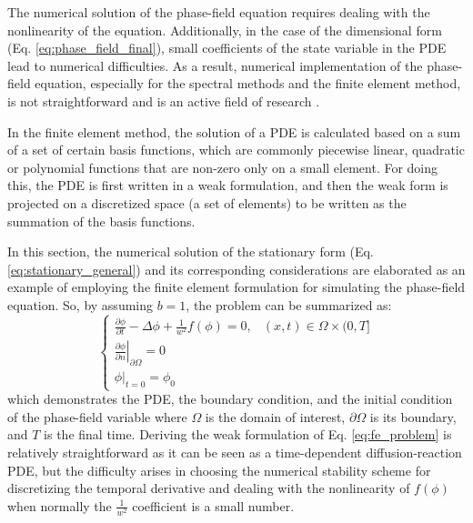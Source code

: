 The numerical solution of the phase-field equation requires dealing with the nonlinearity of the equation. Additionally, in the case of the dimensional form (Eq. \ref{eq:phase_field_final}), small coefficients of the state variable in the \gls{PDE} lead to numerical difficulties. As a result, numerical implementation of the phase-field equation, especially for the spectral methods and the finite element method, is not straightforward and is an active field of research \cite{Shen2010,Abboud2019}.

In the finite element method, the solution of a \gls{PDE} is calculated based on a sum of a set of certain basis functions, which are commonly piecewise linear, quadratic or polynomial functions that are non-zero only on a small element. For doing this, the \gls{PDE} is first written in a weak formulation, and then the weak form is projected on a discretized space (a set of elements) to be written as the summation of the basis functions.

In this section, the numerical solution of the stationary form (Eq. \ref{eq:stationary_general}) and its corresponding considerations are elaborated as an example of employing the finite element formulation for simulating the phase-field equation. So, by assuming $b=1$, the problem can be summarized as:
\begin{equation} \label{eq:fe_problem}
\left\{\begin{array}{ll}
\frac{\partial \phi}{\partial t}-\Delta \phi+\frac{1}{w^{2}} f(\phi)=0, & (x, t) \in \Omega \times(0, T] \\
\left.\frac{\partial \phi}{\partial n} \right|_{\partial \Omega}=0 \\
\left.\phi\right|_{t=0}=\phi_{0}
\end{array}\right.
\end{equation}
which demonstrates the \gls{PDE}, the boundary condition, and the initial condition of the phase-field variable where $\Omega$ is the domain of interest, $\partial \Omega$ is its boundary, and $T$ is the final time. Deriving the weak formulation of Eq. \ref{eq:fe_problem} is relatively straightforward as it can be seen as a time-dependent diffusion-reaction \gls{PDE}, but the difficulty arises in choosing the numerical stability scheme for discretizing the temporal derivative and dealing with the nonlinearity of $f(\phi)$ when normally the $\frac{1}{w^{2}}$ coefficient is a small number.

